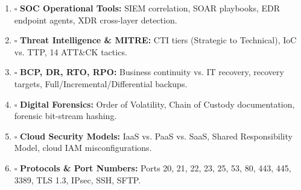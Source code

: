 \begin{enumerate}
\item $\square$ \textbf{SOC Operational Tools:} SIEM correlation, SOAR playbooks, EDR endpoint agents, XDR cross-layer detection.
\item $\square$ \textbf{Threat Intelligence \& MITRE:} CTI tiers (Strategic to Technical), IoC vs. TTP, 14 ATT\&CK tactics.
\item $\square$ \textbf{BCP, DR, RTO, RPO:} Business continuity vs. IT recovery, recovery targets, Full/Incremental/Differential backups.
\item $\square$ \textbf{Digital Forensics:} Order of Volatility, Chain of Custody documentation, forensic bit-stream hashing.
\item $\square$ \textbf{Cloud Security Models:} IaaS vs. PaaS vs. SaaS, Shared Responsibility Model, cloud IAM misconfigurations.
\item $\square$ \textbf{Protocols \& Port Numbers:} Ports 20, 21, 22, 23, 25, 53, 80, 443, 445, 3389, TLS 1.3, IPsec, SSH, SFTP.
\end{enumerate}
